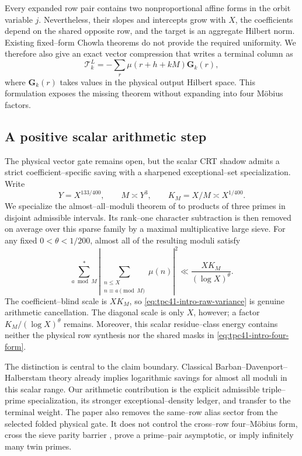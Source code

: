 Every expanded row pair contains two nonproportional affine forms in the
orbit variable \(j\).  Nevertheless, their slopes and intercepts grow with
\(X\), the coefficients depend on the shared opposite row, and the target
is an aggregate Hilbert norm.  Existing fixed--form Chowla theorems do not
provide the required uniformity.  We therefore also give an exact vector
compression that writes a terminal column as
\begin{equation}
 \mathscr T_k^L
 =-\sum_r\mu(r+h+kM)\mathbf G_k(r),
 \label{eq:tpc41-intro-Hilbert-compression}
\end{equation}
where \(\mathbf G_k(r)\) takes values in the physical output Hilbert space.
This formulation exposes the missing theorem without expanding into four
M\"obius factors.

\subsection{A positive scalar arithmetic step}

The physical vector gate remains open, but the scalar CRT shadow admits a
strict coefficient--specific saving with a sharpened exceptional--set
specialization.  Write
\begin{equation}
 Y=X^{133/400},
 \qquad M\asymp Y^3,
 \qquad K_M=X/M\asymp X^{1/400}.
 \label{eq:tpc41-intro-scalar-scales}
\end{equation}
We specialize the almost--all--moduli theorem of
\citet{KlurmanMangerelTeravainen2023} to products of three primes in
disjoint admissible intervals.  Its rank--one character subtraction is
then removed on average over this sparse family by a maximal
multiplicative large sieve.  For any fixed \(0<\theta<1/200\), almost all
of the resulting moduli satisfy
\begin{equation}
 \boxed{
 \sum_{a\bmod M}^{*}
 \left|\sum_{\substack{n\le X\\n\equiv a\pmod M}}\mu(n)\right|^2
 \ll \frac{XK_M}{(\log X)^\theta}.}
 \label{eq:tpc41-intro-raw-variance}
\end{equation}
The coefficient--blind scale is \(XK_M\), so
\eqref{eq:tpc41-intro-raw-variance} is genuine arithmetic cancellation.
The diagonal scale is only \(X\), however; a factor
\(K_M/(\log X)^\theta\) remains.  Moreover, this scalar residue--class
energy contains neither the physical row synthesis nor the shared masks
in \eqref{eq:tpc41-intro-four-form}.

The distinction is central to the claim boundary.  Classical
Barban--Davenport--Halberstam theory already implies logarithmic savings
for almost all moduli in this scalar range.  Our arithmetic contribution
is the explicit admissible triple--prime specialization, its stronger
exceptional--density ledger, and transfer to the terminal weight.  The
paper also removes the same--row alias sector from the selected folded
physical gate.  It does not control the
cross--row four--M\"obius form, cross the sieve parity barrier
\citep{HeathBrown1982Parity}, prove a prime--pair asymptotic, or imply
infinitely many twin primes.

